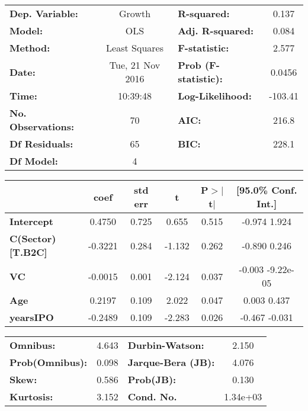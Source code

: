 \begin{center}
    \begin{tabular}{lclc}
    \toprule
    \textbf{Dep. Variable:}    &      Growth      & \textbf{  R-squared:         } &     0.137   \\
    \textbf{Model:}            &       OLS        & \textbf{  Adj. R-squared:    } &     0.084   \\
    \textbf{Method:}           &  Least Squares   & \textbf{  F-statistic:       } &     2.577   \\
    \textbf{Date:}             & Tue, 21 Nov 2016 & \textbf{  Prob (F-statistic):} &   0.0456    \\
    \textbf{Time:}             &     10:39:48     & \textbf{  Log-Likelihood:    } &   -103.41   \\
    \textbf{No. Observations:} &          70      & \textbf{  AIC:               } &     216.8   \\
    \textbf{Df Residuals:}     &          65      & \textbf{  BIC:               } &     228.1   \\
    \textbf{Df Model:}         &           4      & \textbf{                     } &             \\
    \bottomrule
    \end{tabular}
    \begin{tabular}{lccccc}
                              & \textbf{coef} & \textbf{std err} & \textbf{t} & \textbf{P$>$$|$t$|$} & \textbf{[95.0\% Conf. Int.]}  \\
    \midrule
    \textbf{Intercept}        &       0.4750  &        0.725     &     0.655  &         0.515        &        -0.974     1.924       \\
    \textbf{C(Sector)[T.B2C]} &      -0.3221  &        0.284     &    -1.132  &         0.262        &        -0.890     0.246       \\
    \textbf{VC}               &      -0.0015  &        0.001     &    -2.124  &         0.037        &        -0.003 -9.22e-05       \\
    \textbf{Age}              &       0.2197  &        0.109     &     2.022  &         0.047        &         0.003     0.437       \\
    \textbf{yearsIPO}         &      -0.2489  &        0.109     &    -2.283  &         0.026        &        -0.467    -0.031       \\
    \bottomrule
    \end{tabular}
    \begin{tabular}{lclc}
    \textbf{Omnibus:}       &  4.643 & \textbf{  Durbin-Watson:     } &    2.150  \\
    \textbf{Prob(Omnibus):} &  0.098 & \textbf{  Jarque-Bera (JB):  } &    4.076  \\
    \textbf{Skew:}          &  0.586 & \textbf{  Prob(JB):          } &    0.130  \\
    \textbf{Kurtosis:}      &  3.152 & \textbf{  Cond. No.          } & 1.34e+03  \\
    \bottomrule
    \end{tabular}
\end{center}


